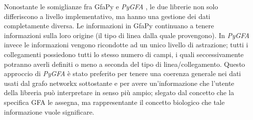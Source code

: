 \documentclass[11pt, a4paper]{book}
\newcommand {\pygfa} {\textit{PyGFA }}
\begin{document}
Nonostante le somiglianze fra GfaPy e \pygfa, le due librerie non solo differiscono
a livello implementativo, ma hanno una gestione dei dati completamente diversa.
Le informazioni in GfaPy continuano a tenere informazioni sulla loro origine (il tipo
di linea dalla quale provengono). In \pygfa invece le informazioni vengono	
ricondotte ad un unico livello di astrazione; tutti i collegamenti possiedono tutti
lo stesso numero di campi, i quali seccessivamente potranno averli definiti o meno
a seconda del tipo di linea/collegamento. Questo approccio di \pygfa è stato
preferito per tenere una coerenza generale nei dati usati dal grafo networkx
sottostante e per avere un'informazione che l'utente della libreria può interpretare
in senso più ampio; slegato dal concetto che la specifica GFA le assegna, ma
rappresentante il concetto biologico che tale informazione vuole significare.



\printbibliography

\listoftodos[TODO]
\end{document}

